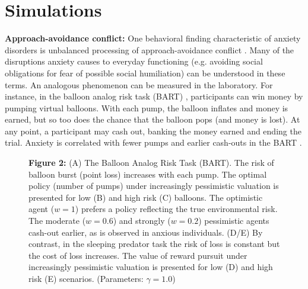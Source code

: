 \documentclass[11pt]{article} %
\begin{document}
\section{Simulations}

\textbf{Approach-avoidance conflict:} One behavioral finding characteristic of anxiety disorders is unbalanced processing of approach-avoidance conflict \citep{aupperle2010}. Many of the disruptions anxiety causes to everyday functioning (e.g. avoiding social obligations for fear of possible social humiliation) can be understood in these terms. An analogous phenomenon can be measured in the laboratory. For instance, in the balloon analog risk task (BART) \citep{Lejuez2002}, participants can win money by pumping virtual balloons. With each pump, the balloon inflates and money is earned, but so too does the chance that the balloon pops (and money is lost). At any point, a participant may cash out, banking the money earned and ending the trial. Anxiety is correlated with fewer pumps and earlier cash-outs in the BART \citep{Maner2007, ramirez2015}.

\begin{figure}
  \centerline{%
  }
  \par \textbf{Figure 2:} (A) The Balloon Analog Risk Task (BART). The risk of balloon burst (point loss) increases with each pump. The optimal policy (number of pumps) under increasingly pessimistic valuation is presented for low (B) and high risk (C) balloons. The optimistic agent ($w=1$) prefers a policy reflecting the true environmental risk. The moderate ($w=0.6$) and strongly ($w=0.2$) pessimistic agents cash-out earlier, as is observed in anxious individuals. (D/E) By contrast, in the sleeping predator task the risk of loss is constant but the cost of loss increases. The value of reward pursuit under increasingly pessimistic valuation is presented for low (D) and high risk (E) scenarios. (Parameters: $\gamma = 1.0$)
\end{figure}
\end{document}
